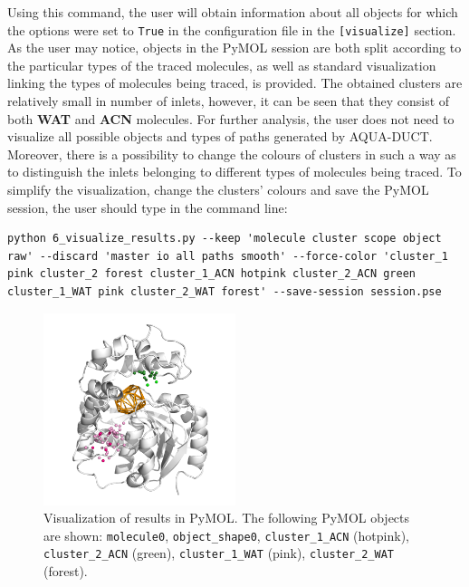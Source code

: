 \documentclass[9pt,tutorial, pubversion]{livecoms}
\begin{document}
Using this command, the user will obtain information about all objects for which the options were set to \texttt{True} in the configuration file in the \texttt{[visualize]} section. As the user may notice, objects in the PyMOL session are both split according to the particular types of the traced molecules, as well as standard visualization linking the types of molecules being traced, is provided. The obtained clusters are relatively small in number of inlets, however, it can be seen that they consist of both \textbf{WAT} and \textbf{ACN} molecules. For further analysis, the user does not need to visualize all possible objects and types of paths generated by AQUA-DUCT. Moreover, there is a possibility to change the colours of clusters in such a way as to distinguish the inlets belonging to different types of molecules being traced. To simplify the visualization, change the clusters' colours and save the PyMOL session, the user should type in the command line:
\begin{lstlisting}
python 6_visualize_results.py --keep 'molecule cluster scope object raw' --discard 'master io all paths smooth' --force-color 'cluster_1 pink cluster_2 forest cluster_1_ACN hotpink cluster_2_ACN green cluster_1_WAT pink cluster_2_WAT forest' --save-session session.pse 
\end{lstlisting}
\begin{figure}[ht!]
\centering
\includegraphics[width=0.5\textwidth]{Tut6.2.png}
\caption{Visualization of results in PyMOL. The following PyMOL objects are shown: \texttt{molecule0}, \texttt{object\_shape0}, \texttt{cluster\_1\_ACN} (hotpink), \texttt{cluster\_2\_ACN} (green), \texttt{cluster\_1\_WAT} (pink), \texttt{cluster\_2\_WAT} (forest).}
\label{Tut6.2}
\end{figure}
\end{document}
